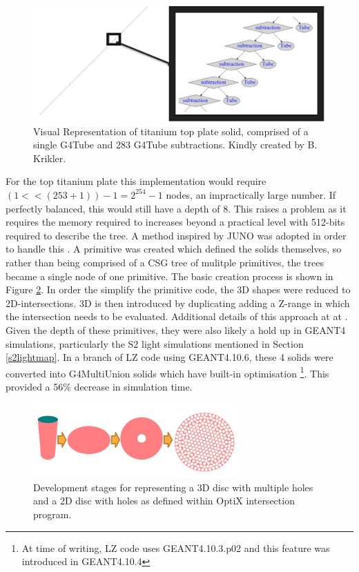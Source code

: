 \begin{figure}[!htbp]
\includegraphics[width=\textwidth]{Figures/Simulations/unbalanced_ptfe.png}
\centering
\caption{Visual Representation of titanium top plate solid, comprised of a single G4Tube and 283 G4Tube subtractions. Kindly created by B. Krikler.}
\label{fig:Opticks_unbalanced_shape}
\end{figure}
For the top titanium plate this implementation would require $(1 << (253 + 1))-1 = 2^{254} - 1$ nodes, an impractically large number.
If perfectly balanced, this would still have a depth of 8.
This raises a problem as it requires the memory required to increases beyond a practical level with 512-bits required to describe the tree.
A method inspired by JUNO was adopted in order to handle this \cite{Opticks_CHEP_2021_ref}.
A primitive was created which defined the solids themselves, so rather than being comprised of a CSG tree of mulitple primitives, the trees became a single node of one primitive.
The basic creation process is shown in Figure \ref{fig:Opticks_PTFE_primative}.
In order the simplify the primitive code, the 3D shapes were reduced to 2D-intersections.
3D is then introduced by duplicating adding a Z-range in which the intersection needs to be evaluated.
Additional details of this approach at at \cite{optix_primitive_code_ref}.
Given the depth of these primitives, they were also likely a hold up in GEANT4 simulations, particularly the S2 light simulations mentioned in Section \ref{s2lightmap}.
In a branch of LZ code using GEANT4.10.6, these 4 solids were converted into G4MultiUnion solids which have built-in optimisation \cite{multiunion_ref}\footnote{At time of writing, LZ code uses GEANT4.10.3.p02 and this feature was introduced in GEANT4.10.4}.
This provided a 56\% decrease in simulation time.
\begin{figure}[!htbp]
\includegraphics[width=0.7\textwidth]{Figures/Simulations/opticks_PTFE_primative.png}
\centering
\caption{Development stages for representing a 3D disc with multiple holes and a 2D disc with holes as defined within OptiX intersection program.}
\label{fig:Opticks_PTFE_primative}
\end{figure}

